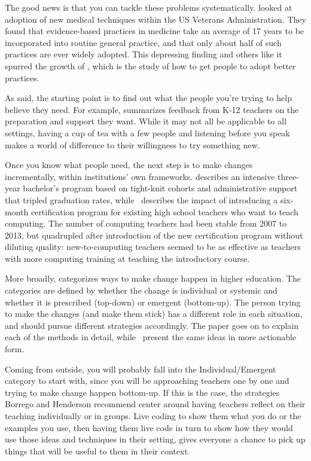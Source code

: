 The good news is that you can tackle these problems systematically.
\cite{Baue2015} looked at adoption of new medical techniques within the US Veterans Administration.
They found that evidence-based practices in medicine
take an average of 17 years to be incorporated into routine general practice,
and that only about half of such practices are ever widely adopted.
This depressing finding and others like it spurred the growth of
,
which is the study of how to get people to adopt better practices.

As  said,
the starting point is to find out what the people you're trying to help believe they need.
For example,
\cite{Yada2016} summarizes feedback from K-12 teachers on the preparation and support they want.
While it may not all be applicable to all settings,
having a cup of tea with a few people and listening before you speak
makes a world of difference to their willingness to try something new.

Once you know what people need,
the next step is to make changes incrementally,
within institutions' own frameworks.
\cite{Nara2018} describes an intensive three-year bachelor's program
based on tight-knit cohorts and administrative support
that tripled graduation rates,
while~\cite{Hu2017} describes the impact of introducing a six-month certification program
for existing high school teachers who want to teach computing.
The number of computing teachers had been stable from 2007 to 2013,
but quadrupled after introduction of the new certification program
without diluting quality:
new-to-computing teachers seemed to be as effective as teachers with more computing training
at teaching the introductory course.

More broadly,
\cite{Borr2014} categorizes ways to make change happen in higher education.
The categories are defined by whether the change is individual or systemic
and whether it is prescribed (top-down) or emergent (bottom-up).
The person trying to make the changes (and make them stick)
has a different role in each situation,
and should pursue different strategies accordingly.
The paper goes on to explain each of the methods in detail,
while~\cite{Hend2015a,Hend2015b} present the same ideas in more actionable form.

Coming from outside,
you will probably fall into the Individual/Emergent category to start with,
since you will be approaching teachers one by one
and trying to make change happen bottom-up.
If this is the case,
the strategies Borrego and Henderson recommend center around
having teachers reflect on their teaching individually or in groups.
Live coding to show them what you do or the examples you use,
then having them live code in turn
to show how they would use those ideas and techniques in their setting,
gives everyone a chance to pick up things that will be useful to them in their context.


